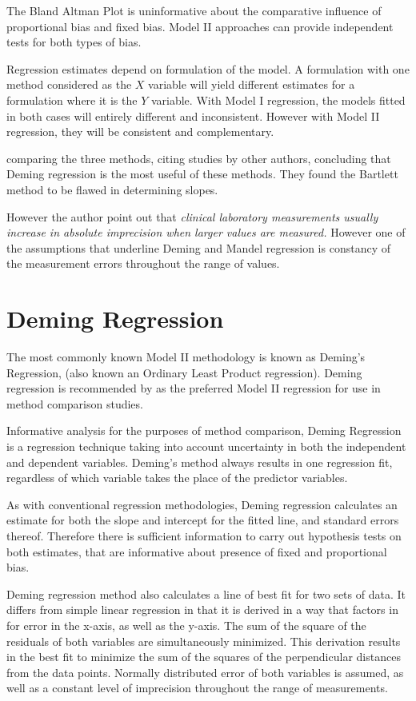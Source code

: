 \documentclass[12pt, a4paper]{report}
\theoremstyle{plain}
\theoremstyle{definition}
\theoremstyle{remark}
\begin{document}
The Bland Altman Plot is uninformative about the comparative influence of proportional bias and fixed bias. Model II approaches can provide independent tests for
both types of bias.

Regression estimates depend on formulation of the model. A
formulation with one method considered as the $X$ variable will
yield different estimates for a formulation where it is the $Y$
variable. With Model I regression, the models fitted in both cases
will entirely different and inconsistent. However with Model II
regression, they will be consistent and complementary.

\citet{CornCoch} comparing the three methods, citing studies by other authors, concluding that Deming regression is the most useful of these methods. They found the Bartlett method to be
flawed in determining slopes.

However the author point out that \emph{ clinical laboratory measurements usually increase in absolute imprecision when larger values are measured.} However one of the assumptions that underline Deming and Mandel regression is constancy of the measurement errors throughout the range of values.





\section{Deming Regression}
The most commonly known Model II methodology is known as Deming's Regression, (also known an Ordinary Least Product regression). Deming regression is recommended by \citet*{CornCoch} as the preferred Model II regression for use in method comparison studies.

Informative analysis for the purposes of method comparison, Deming Regression is a regression technique taking into account uncertainty in both the independent and dependent variables.
Deming’s method always results in one regression fit, regardless of which variable takes the place of the predictor variables.

As with conventional regression methodologies, Deming regression calculates an estimate for both the slope and intercept for the
fitted line, and standard errors thereof. Therefore there is sufficient information to carry out hypothesis tests on both
estimates, that are informative about presence of fixed and proportional bias.

Deming regression method also calculates a line of best fit for two sets of data. It differs from simple linear regression in that it is derived in a way that factors in for error in the x-axis, as well as the y-axis. The sum of the square of the residuals of both variables are simultaneously minimized. This derivation results in the best fit to minimize the sum of the squares of the perpendicular distances from the data points. Normally distributed error of both variables is assumed, as well as a constant level of imprecision throughout the range of measurements.
\end{document}
